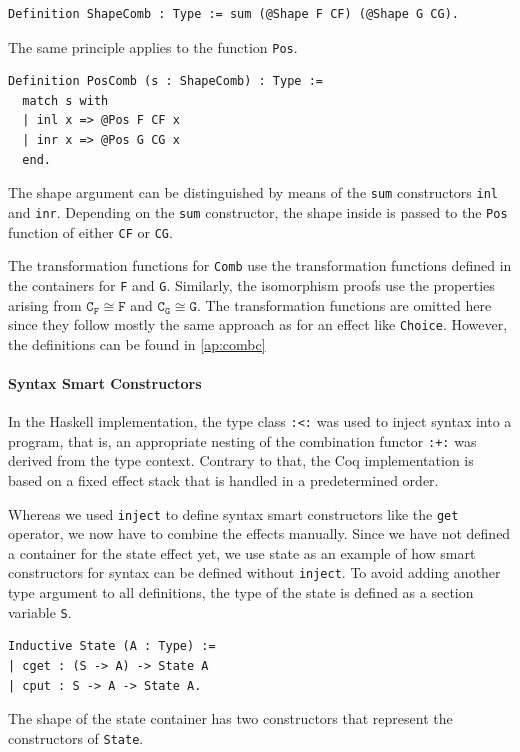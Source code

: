 \documentclass[a4paper, 11pt, fleqn, twoside, abstract=on]{scrreprt}
\newcommand{\hinl}[1]{\texttt{#1}}
\newcommand{\cinl}[1]{\texttt{#1}}
\begin{document}
\begin{verbatim}
Definition ShapeComb : Type := sum (@Shape F CF) (@Shape G CG).
\end{verbatim}
\noindent
The same principle applies to the function \cinl{Pos}.

\begin{verbatim}
Definition PosComb (s : ShapeComb) : Type :=
  match s with
  | inl x => @Pos F CF x
  | inr x => @Pos G CG x
  end.
\end{verbatim}
\noindent
The shape argument can be distinguished by means of the \cinl{sum} constructors \cinl{inl} and \cinl{inr}.
Depending on the \cinl{sum} constructor, the shape inside is passed to the \cinl{Pos} function of either \cinl{CF} or \cinl{CG}.

The transformation functions for \cinl{Comb} use the transformation functions defined in the containers for \cinl{F} and \cinl{G}.
Similarly, the isomorphism proofs use the properties arising from $\texttt{C}_\texttt{F} \cong \texttt{F}$ and $\texttt{C}_\texttt{G} \cong \texttt{G}$.
The transformation functions are omitted here since they follow mostly the same approach as for an effect like \cinl{Choice}.
However, the definitions can be found in \autoref{ap:combc}

\paragraph{Syntax Smart Constructors}

In the Haskell implementation, the type class \hinl{:<:} was used to inject syntax into a program, that is, an appropriate nesting of the combination functor \hinl{:+:} was derived from the type context.
Contrary to that, the Coq implementation is based on a fixed effect stack that is handled in a predetermined order.

Whereas we used \hinl{inject} to define syntax smart constructors like the \hinl{get} operator, we now have to combine the effects manually.
Since we have not defined a container for the state effect yet, we use state as an example of how smart constructors for syntax can be defined without \hinl{inject}.
To avoid adding another type argument to all definitions, the type of the state is defined as a section variable \cinl{S}.

\begin{verbatim}
Inductive State (A : Type) :=
| cget : (S -> A) -> State A
| cput : S -> A -> State A.
\end{verbatim}
\noindent
The shape of the state container has two constructors that represent the constructors of \cinl{State}.
\end{document}
